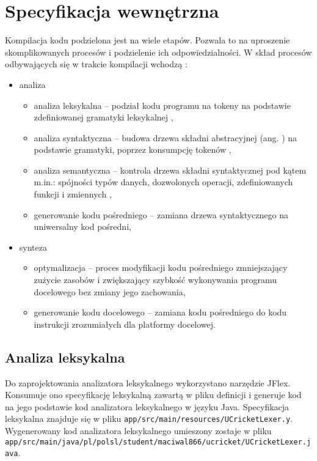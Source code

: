 \chapter{Specyfikacja wewnętrzna}
\label{ch:05}
Kompilacja kodu podzielona jest na wiele etapów. Pozwala to na uproszenie skomplikowanych procesów i podzielenie ich odpowiedzialności. W skład procesów odbywających się w trakcie kompilacji wchodzą \cite{Aho2022Kompilatory}:
\begin{itemize}
\item analiza
\begin{itemize}
\item analiza leksykalna -- podział kodu programu na tokeny na podstawie zdefiniowanej gramatyki leksykalnej \cite{appelModernCompilerImplementation2002},
\item analiza syntaktyczna -- budowa drzewa składni abstracyjnej \cite{appelModernCompilerImplementation2002} (ang. ) na podstawie gramatyki, poprzez konsumpcję tokenów \cite{appelModernCompilerImplementation2002},
\item analiza semantyczna -- kontrola drzewa składni syntaktycznej pod kątem m.in.: spójności typów danych, dozwolonych operacji, zdefiniowanych funkcji i zmiennych \cite{nystromCraftingInterpreters2021},
\item generowanie kodu pośredniego -- zamiana drzewa syntaktycznego na uniwersalny kod pośredni,
\end{itemize}
\item synteza
\begin{itemize}
\item optymalizacja -- proces modyfikacji kodu pośredniego zmniejszający zużycie zasobów i zwiększający szybkość wykonywania programu docelowego bez zmiany jego zachowania,
\item generowanie kodu docelowego -- zamiana kodu pośredniego do kodu instrukcji zrozumiałych dla platformy docelowej.
\end{itemize}
\end{itemize}

\section{Analiza leksykalna}
Do zaprojektowania analizatora leksykalnego wykorzystano narzędzie JFlex. Konsumuje ono specyfikację leksykalną zawartą w pliku definicji i generuje kod na jego podstawie kod analizatora leksykalnego w języku Java. Specyfikacja leksykalna znajduje się w pliku \lstinline|app/src/main/resources/UCricketLexer.y|. Wygenerowany kod analizatora leksykalnego umieszony zostaje w pliku \lstinline|app/src/main/java/pl/polsl/student/maciwal866/ucricket/UCricketLexer.java|.

